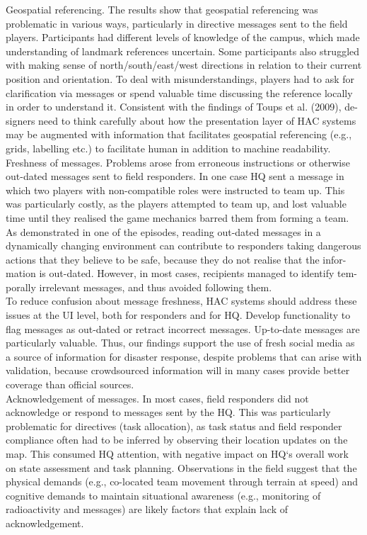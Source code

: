 Geospatial referencing. The results show that geospatial referencing was problematic in various ways, particularly in directive messages sent to the field players. Participants had different levels of knowledge of the campus, which made understanding of landmark references uncertain. Some participants also struggled with making sense of north/south/east/west directions in relation to their current position and orientation. To deal with misunderstandings, players had to ask for clarification via messages or spend valuable time discussing the reference locally in order to understand it. Consistent with the findings of Toups et al. (2009), de- signers need to think carefully about how the presentation layer of HAC systems may be augmented with information that facilitates geospatial referencing (e.g., grids, labelling etc.) to facilitate human in addition to machine readability. Freshness of messages. Problems arose from erroneous instructions or otherwise out-dated messages sent to field responders. In one case HQ sent a message in which two players with non-compatible roles were instructed to team up. This was particularly costly, as the players attempted to team up, and lost valuable time until they realised the game mechanics barred them from forming a team.\\

As demonstrated in one of the episodes, reading out-dated messages in a dynamically changing environment can contribute to responders taking dangerous actions that they believe to be safe, because they do not realise that the infor- mation is out-dated. However, in most cases, recipients managed to identify tem- porally irrelevant messages, and thus avoided following them.\\

To reduce confusion about message freshness, HAC systems should address these issues at the UI level, both for responders and for HQ. Develop functionality to flag messages as out-dated or retract incorrect messages. Up-to-date messages are particularly valuable. Thus, our findings support the use of fresh social media as a source of information for disaster response, despite problems that can arise with validation, because crowdsourced information will in many cases provide better coverage than official sources.\\

Acknowledgement of messages. In most cases, field responders did not acknowledge or respond to messages sent by the HQ. This was particularly problematic for directives (task allocation), as task status and field responder compliance often had to be inferred by observing their location updates on the map. This consumed HQ attention, with negative impact on HQ`s overall work on state assessment and task planning. Observations in the field suggest that the physical demands (e.g., co-located team movement through terrain at speed) and cognitive demands to maintain situational awareness (e.g., monitoring of radioactivity and messages) are likely factors that explain lack of acknowledgement.\\

